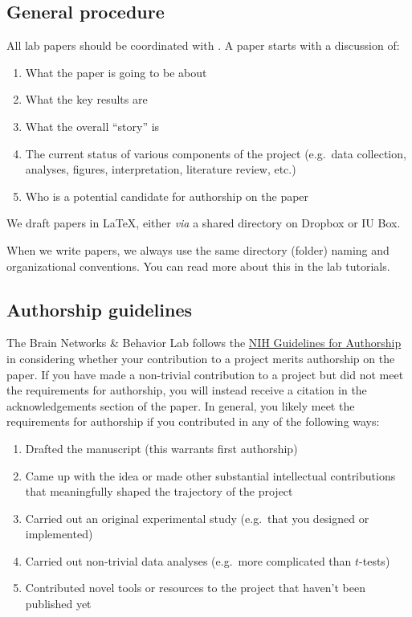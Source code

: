 \documentclass{tufte-book} %
\begin{document}
\subsection{General procedure}
All lab papers should be coordinated with \director. A paper starts with a discussion of:
\begin{enumerate}
\item What the paper is going to be about
\item What the key results are
\item What the overall ``story'' is
\item The current status of various components of the project (e.g.\ data collection, analyses, figures, interpretation, literature review, etc.)
\item Who is a potential candidate for authorship on the paper
\end{enumerate}

We draft papers in \LaTeX, either \emph{via} a shared directory on Dropbox or IU Box.

When we write papers, we always use the same directory (folder) naming and organizational conventions. You can read more about this in the lab tutorials.

\subsection{Authorship guidelines}
 The Brain Networks \& Behavior Lab follows the \href{https://oir.nih.gov/sites/default/files/uploads/sourcebook/documents/ethical_conduct/guidelines-authorship_contributions.pdf}{NIH Guidelines for Authorship} in considering whether your contribution to a project merits authorship on the paper. If you have made a non-trivial contribution to a project but did not meet the requirements for authorship, you will instead receive a citation in the acknowledgements section of the paper. In general, you likely meet the requirements for authorship if you contributed in any of the following ways:
\begin{enumerate}
\item Drafted the manuscript (this warrants first authorship)
\item Came up with the idea or made other substantial intellectual contributions that meaningfully shaped the trajectory of the project
\item Carried out an original experimental study (e.g.\ that you designed or implemented)
\item Carried out non-trivial data analyses (e.g.\ more complicated than $t$-tests)
\item Contributed novel tools or resources to the project that haven't been published yet
\end{enumerate}
\end{document}
